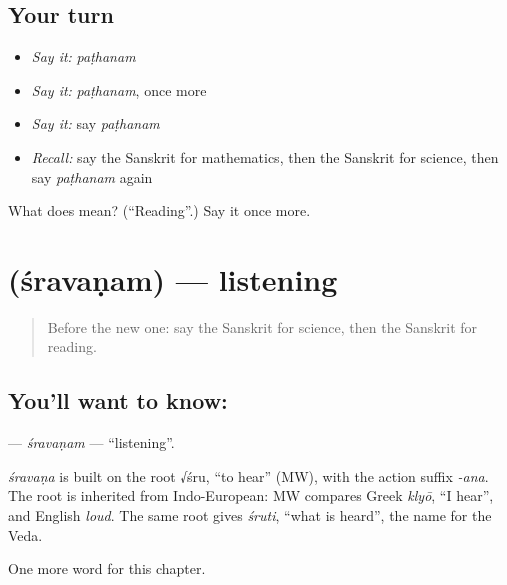 \subsection*{Your turn}
\begin{itemize}
\raggedright
  \item \emph{Say it:} \emph{paṭhanam}
  \item \emph{Say it:} \emph{paṭhanam}, once more
  \item \emph{Say it:} say \emph{paṭhanam}
  \item \emph{Recall:} say the Sanskrit for mathematics, then the Sanskrit for science, then say \emph{paṭhanam} again
\end{itemize}

\begin{tcolorbox}[breakable,colback=teal!4,colframe=teal!35!black,title={Before you move on}]
What does  mean? (\textquotedblleft{}Reading\textquotedblright{}.) Say it once more.
\end{tcolorbox}
\section[\texorpdfstring{\sk{श्रवणम्} (śravaṇam)}{श्रवणम् (śravaṇam)}]{ (śravaṇam) — listening}

\label{lesson:SA-C200-sravanam}



\begin{quote}
Before the new one: say the Sanskrit for science, then the Sanskrit for reading.
\end{quote}

\subsection*{You'll want to know: }
\textbf{} — \emph{śravaṇam} — \textquotedblleft{}listening\textquotedblright{}.

\begin{cousinweb}
\emph{śravaṇa} is built on the root √śru, \textquotedblleft{}to hear\textquotedblright{} (MW), with the action suffix \emph{-ana}. The root is inherited from Indo-European: MW compares Greek \emph{klyō}, \textquotedblleft{}I hear\textquotedblright{}, and English \emph{loud}. The same root gives \emph{śruti}, \textquotedblleft{}what is heard\textquotedblright{}, the name for the Veda.
\end{cousinweb}

\begin{grammarlens}[title={What you've built}]
One more word for this chapter.
\end{grammarlens}

